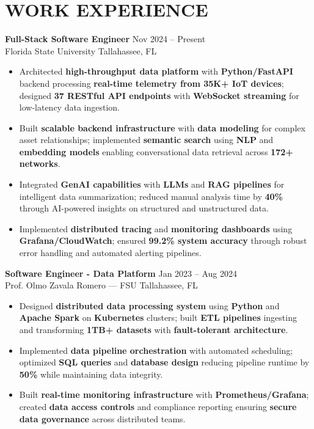 \documentclass[letterpaper,10pt]{article}
\newcommand{\resumeItem}[1]{\item\small #1}
\newcommand{\resumeSubheading}[4]{
  \vspace{6pt}
  \noindent
  \textbf{#1} \hfill {\footnotesize #2} \\
  [-1pt]
  \noindent
  \small #3 \hfill {\small #4}
  \vspace{3pt}
}
\newcommand{\resumeItemsStart}{\vspace{-2pt}\begin{itemize}}
\newcommand{\resumeItemsEnd}{\end{itemize}\vspace{6pt}}
\begin{document}
\section{\textcolor{metablue}{WORK EXPERIENCE}}
\vspace{-12pt}

\resumeSubheading
{Full-Stack Software Engineer}{Nov 2024 -- Present}
{Florida State University}{Tallahassee, FL}
\resumeItemsStart
\resumeItem{Architected \textbf{high-throughput data platform} with \textbf{Python/FastAPI} backend processing \textbf{real-time telemetry from 35K+ IoT devices}; designed \textbf{37 RESTful API endpoints} with \textbf{WebSocket streaming} for low-latency data ingestion.}
\resumeItem{Built \textbf{scalable backend infrastructure} with \textbf{data modeling} for complex asset relationships; implemented \textbf{semantic search} using \textbf{NLP} and \textbf{embedding models} enabling conversational data retrieval across \textbf{172+ networks}.}
\resumeItem{Integrated \textbf{GenAI capabilities} with \textbf{LLMs} and \textbf{RAG pipelines} for intelligent data summarization; reduced manual analysis time by \textbf{40\%} through AI-powered insights on structured and unstructured data.}
\resumeItem{Implemented \textbf{distributed tracing} and \textbf{monitoring dashboards} using \textbf{Grafana/CloudWatch}; ensured \textbf{99.2\% system accuracy} through robust error handling and automated alerting pipelines.}
\resumeItemsEnd
\vspace{-12pt}

\resumeSubheading
{Software Engineer - Data Platform}{Jan 2023 -- Aug 2024}
{Prof. Olmo Zavala Romero — FSU}{Tallahassee, FL}
\resumeItemsStart
\resumeItem{Designed \textbf{distributed data processing system} using \textbf{Python} and \textbf{Apache Spark} on \textbf{Kubernetes} clusters; built \textbf{ETL pipelines} ingesting and transforming \textbf{1TB+ datasets} with \textbf{fault-tolerant architecture}.}
\resumeItem{Implemented \textbf{data pipeline orchestration} with automated scheduling; optimized \textbf{SQL queries} and \textbf{database design} reducing pipeline runtime by \textbf{50\%} while maintaining data integrity.}
\resumeItem{Built \textbf{real-time monitoring infrastructure} with \textbf{Prometheus/Grafana}; created \textbf{data access controls} and compliance reporting ensuring \textbf{secure data governance} across distributed teams.}
\resumeItemsEnd
\vspace{-12pt}
\end{document}
